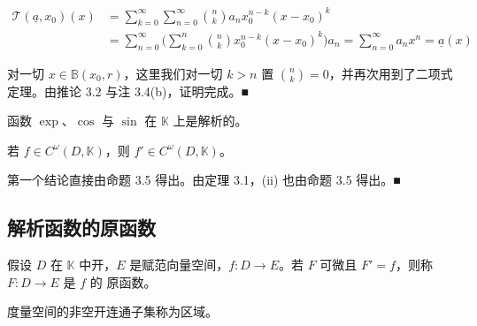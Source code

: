 \begin{proposition}
\begin{subitems}
\begin{equation*}
\begin{aligned}
\mathcal{T}(\underline{a},x_{0})(x)&=\sum_{k=0}^{\infty}\sum_{n=0}^{\infty}\binom{n}{k}a_{n} x_{0}^{n-k}(x-x_{0})^{k}\\&=\sum_{n=0}^{\infty}\Big(\sum_{k=0}^{n}\binom{n}{k}x_{0}^{n-k}(x-x_{0})^{k}\Big)a_{n}=\sum_{n=0}^{\infty}a_{n} x^{n}=\underline{a}(x)
\end{aligned}
\end{equation*}

对一切 $ x \in \mathbb{B}(x_0, r) $，这里我们对一切 $ k > n $ 置 $ \binom{n}{k} = 0 $，并再次用到了二项式定理。由推论 3.2 与注 3.4(b)，证明完成。■

\end{subitems}

\end{proposition}

\begin{corollary}

\begin{subitems}
\item

函数 $ \exp $、$ \cos $ 与 $ \sin $ 在 $ \mathbb{K} $ 上是解析的。

\item

若 $ f \in C^\omega(D, \mathbb{K}) $，则 $ f' \in C^\omega(D, \mathbb{K}) $。

\proofhead
第一个结论直接由命题 3.5 得出。由定理 3.1，(ii) 也由命题 3.5 得出。■
\end{subitems}

\end{corollary}

\subsection*{解析函数的原函数}

假设 $D$ 在 $\mathbb{K}$ 中开，$E$ 是赋范向量空间，$f: D \to E$。若 $F$ 可微且 $F' = f$，则称 $F: D \to E$ 是 $f$ 的 $\text{原函数}$。

度量空间的非空开连通子集称为区域。

